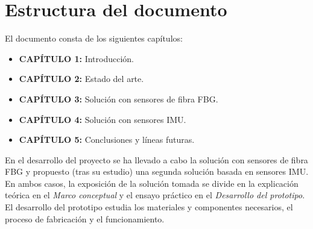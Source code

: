 \section{Estructura del documento}
\label{sec:disposicion1}

El documento consta de los siguientes capítulos: 

\begin{itemize}[label=]
	\item {\textbf{CAPÍTULO 1:} Introducción.}
	\item {\textbf{CAPÍTULO 2:} Estado del arte.}
	\item {\textbf{CAPÍTULO 3:} Solución con sensores de fibra FBG.}
	\item {\textbf{CAPÍTULO 4:} Solución con sensores IMU.}
	\item {\textbf{CAPÍTULO 5:} Conclusiones y líneas futuras.}
\end{itemize}


En el desarrollo del proyecto se ha llevado a cabo la solución con sensores de fibra FBG y propuesto (tras su estudio) una segunda solución basada en sensores IMU. En ambos casos, la exposición de la solución tomada se divide en la explicación teórica en el \textit{Marco conceptual} y el ensayo práctico en el \textit{Desarrollo del prototipo}. El desarrollo del prototipo estudia los materiales y componentes necesarios, el proceso de fabricación y el funcionamiento. 


